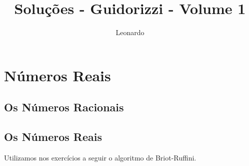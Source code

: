 \documentclass[10pt]{book}
\begin{document}
\author{Leonardo}
\title{Soluções - Guidorizzi - Volume 1}
\maketitle 
\chapter{Números Reais}
\section{Os Números Racionais}
\section{Os Números Reais}
Utilizamos nos exercícios a seguir o algoritmo de Briot-Ruffini.
\end{document}
